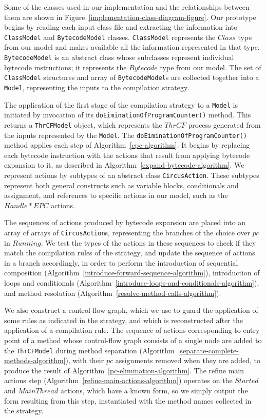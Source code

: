 Some of the classes used in our implementation and the relationships
between them are shown in
Figure~\ref{implementation-class-diagram-figure}. 
Our prototype begins by reading each input class file and extracting
the information into \texttt{ClassModel} and
\texttt{BytecodeModel} classes.
\texttt{ClassModel} represents the $Class$ type from our model and
makes available all the information represented in that type.
\texttt{BytecodeModel} is an abstract class whose subclasses represent
individual bytecode instructions; it represents the $Bytecode$ type
from our model.
The set of \texttt{ClassModel} structures and array of
\texttt{BytecodeModel}s are collected together into a \texttt{Model},
representing the inputs to the compilation strategy.

The application of the first stage of the compilation strategy to a
\texttt{Model} is initiated by invocation of its
\texttt{doEiminationOfProgramCounter()} method.
This returns a \texttt{ThrCFModel} object, which represents the
$ThrCF$ process generated from the inputs represented by the
\texttt{Model}.
The \texttt{doEiminationOfProgramCounter()} method applies each step
of Algorithm~\ref{epc-algorithm}.
It begins by replacing each bytecode instruction with the \Circus{}
actions that result from applying bytecode expansion to it, as
described in Algorithm~\ref{expand-bytecode-algorithm}.
We represent \Circus{} actions by subtypes of an abstract class
\texttt{CircusAction}.
These subtypes represent both general \Circus{} constructs such as
variable blocks, conditionals and assignment, and references to
specific actions in our model, such as the $Handle{*}EPC$ actions.

The sequences of actions produced by bytecode expansion are placed
into an array of arrays of \texttt{CircusAction}s, representing the
branches of the choice over $pc$ in $Running$.
We test the types of the actions in these sequences to check if they
match the compilation rules of the strategy, and update the sequence
of actions in a branch accordingly, in order to perform the
introduction of sequential composition
(Algorithm~\ref{introduce-forward-sequence-algorithm}), introduction
of loops and conditionals
(Algorithm~\ref{introduce-loops-and-conditionals-algorithm}), and
method resolution (Algorithm~\ref{resolve-method-calls-algorithm}).

We also construct a control-flow graph, which we use to guard the
application of some rules as indicated in the strategy, and which is
reconstructed after the application of a compilation rule.
The sequence of actions corresponding to entry point of a method whose
control-flow graph consists of a single node are added to the
\texttt{ThrCFModel} during method separation
(Algorithm~\ref{separate-complete-methods-algorithm}), with their $pc$
assignments removed when they are added, to produce the result of
Algorithm~\ref{pc-elimination-algorithm}.
The refine main actions step
(Algorithm~\ref{refine-main-actions-algorithm}) operates on the
$Started$ and $MainThread$ actions, which have a known form, so we
simply output the form resulting from this step, instantiated with the
method names collected in the strategy.

